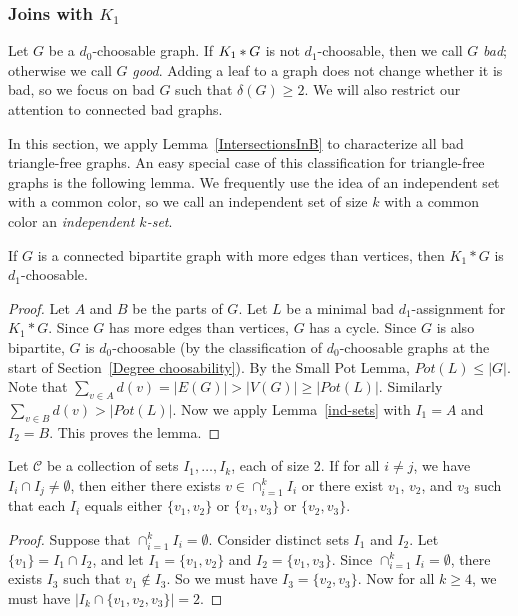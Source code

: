 \subsubsection{\texorpdfstring{Joins with $K_1$}{Joins with a vertex}}
Let $G$ be a $d_0$-choosable graph.  If $K_1 \mbox{\hspace{2 pt}$\ast$\hspace{2 pt}} G$ is not $d_1$-choosable, then we call $G$ \textit{bad}; otherwise we call $G$ \textit{good}.
Adding a leaf to a graph does not change whether it is bad, so
we focus on bad $G$ such that $\delta(G)\ge 2$.  We will also restrict our
attention to connected bad graphs.  

In this section, we apply Lemma~\ref{IntersectionsInB} to characterize
all bad triangle-free graphs.  
An easy special case of this classification for triangle-free graphs is the following lemma.
We frequently use the idea of an independent set with a common color, so we call an independent set of size $k$ with a
common color an \textit{independent $k$-set}.

\begin{lem}
If $G$ is a connected bipartite graph with more edges than vertices, then
$K_1*G$ is $d_1$-choosable.
\end{lem}
\begin{proof}
Let $A$ and $B$ be the parts of $G$.  Let $L$ be a minimal bad $d_1$-assignment
for $K_1*G$. Since $G$ has more edges than vertices, $G$ has a cycle.  Since $G$ is also
bipartite, $G$ is $d_0$-choosable (by the classification of $d_0$-choosable
graphs at the start of Section~\ref{Degree choosability}).  By the Small Pot Lemma, $Pot(L)\le
|G|$.
Note that $\sum_{v\in A}d(v) =
|E(G)|>|V(G)|\ge |Pot(L)|$.  Similarly $\sum_{v\in B}d(v)>|Pot(L)|$.  Now we
apply Lemma~\ref{ind-sets} with $I_1=A$ and $I_2=B$.  This proves the lemma.
\end{proof}

\begin{lem}
Let $\mathcal{C}$ be a collection of sets $I_1,\ldots,I_k$, each of size 2. If
for all $i\ne j$, we have $I_i\cap I_j\ne\emptyset$, then either there exists 
$v\in \cap_{i=1}^kI_i$ or there exist $v_1$, $v_2$, and $v_3$ such that each
$I_i$ equals either $\{v_1,v_2\}$ or $\{v_1,v_3\}$ or $\{v_2,v_3\}$.
\label{intersection}
\end{lem}
\begin{proof}
Suppose that $\cap_{i=1}^kI_i=\emptyset$.
Consider distinct sets $I_1$ and $I_2$.  Let $\{v_1\}=I_1\cap I_2$, and let
$I_1=\{v_1,v_2\}$ and $I_2=\{v_1,v_3\}$.  Since 
$\cap_{i=1}^kI_i=\emptyset$, there exists $I_3$ such that $v_1\notin I_3$.
So we must have $I_3=\{v_2,v_3\}$.  Now for all $k\ge 4$, we must have
$|I_k\cap\{v_1,v_2,v_3\}|=2$.
\end{proof}

